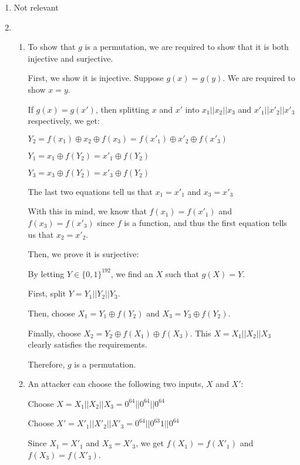 


\begin{enumerate}[label=(\alph*)]
  \item
    Not relevant

  \item
    \begin{enumerate}[label=(\roman*)]
      \item
        To show that $g$ is a permutation, we are required to show that it is both injective and surjective.

        First, we show it is injective. Suppose $g(x) = g(y)$. We are required to show $x=y$.

        If $g(x) = g(x')$, then splitting $x$ and $x'$ into $x_1||x_2||x_3$ and $x'_1||x'_2||x'_3$ respectively, we get:

        $Y_2 = f(x_1) \oplus x_2 \oplus f(x_3) = f(x'_1) \oplus x'_2 \oplus f(x'_3)$

        $Y_1 = x_1 \oplus f(Y_2) = x'_1 \oplus f(Y_2)$

        $Y_3 = x_3 \oplus f(Y_2) = x'_3 \oplus f(Y_2)$

        The last two equations tell us that $x_1 = x'_1$ and $x_3 = x'_3$

        With this in mind, we know that $f(x_1) = f(x'_1)$ and $f(x_3) = f(x'_3)$ since $f$ is a function, and thus the first equation tells us that $x_2 = x'_2$.

        Then, we prove it is surjective:

        By letting $Y \in \{0,1\}^{192}$, we find an $X$ such that $g(X) = Y$.

        First, split $Y = Y_1||Y_2||Y_3$.

        Then, choose $X_1 = Y_1 \oplus f(Y_2)$ and $X_3 = Y_3 \oplus f(Y_2)$.

        Finally, choose $X_2 = Y_2 \oplus f(X_1) \oplus f(X_3)$. This $X = X_1||X_2||X_3$ clearly satisfies the requirements.
        
        Therefore, $g$ is a permutation.

      \item
        An attacker can choose the following two inputs, $X$ and $X'$:

        Choose $X = X_1||X_2||X_3 = 0^{64}||0^{64}||0^{64}$

        Choose $X' = X'_1||X'_2||X'_3 = 0^{64}||0^{63}1||0^{64}$

        Since $X_1 = X'_1$ and $X_3 = X'_3$, we get $f(X_1) = f(X'_1)$ and $f(X_3) = f(X'_3)$.


\end{enumerate}
\end{enumerate}
